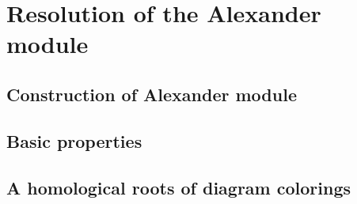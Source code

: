 \section{Resolution of the Alexander module}
\label{section2}

\subsection{Construction of Alexander module}
\label{alexander module discussion}



\subsection{Basic properties}



\subsection{A homological roots of diagram colorings}
\label{homological coloring}



